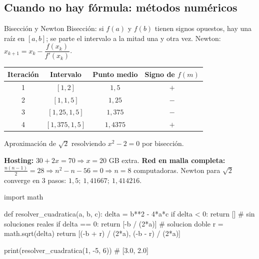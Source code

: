 \subsection{Cuando no hay f\'ormula: m\'etodos num\'ericos}
\begin{tmdef}{Bisecci\'on y Newton}
Bisecci\'on: si $f(a)$ y $f(b)$ tienen signos opuestos, hay una ra\'iz en $[a,b]$; se parte el intervalo a la mitad una y otra vez. Newton: $x_{k+1}=x_k-\dfrac{f(x_k)}{f'(x_k)}$.
\end{tmdef}

\begin{center}
\begin{tabular}{|c|c|c|c|}
\hline
\rowcolor{tmAzulClaro}\textbf{Iteraci\'on} & \textbf{Intervalo} & \textbf{Punto medio} & \textbf{Signo de $f(m)$}\\ \hline
1 & $[1, 2]$ & $1{,}5$ & $+$\\ \hline
2 & $[1, 1{,}5]$ & $1{,}25$ & $-$\\ \hline
3 & $[1{,}25, 1{,}5]$ & $1{,}375$ & $-$\\ \hline
4 & $[1{,}375, 1{,}5]$ & $1{,}4375$ & $+$\\ \hline
\end{tabular}

{\small Aproximaci\'on de $\sqrt2$ resolviendo $x^2-2=0$ por bisecci\'on.}
\end{center}

\begin{tmsistemas}
\textbf{Hosting:} $30+2x=70\Rightarrow x=20$ GB extra. \textbf{Red en malla completa:} $\frac{n(n-1)}{2}=28\Rightarrow n^2-n-56=0\Rightarrow n=8$ computadoras. Newton para $\sqrt2$ converge en 3 pasos: $1{,}5;\ 1{,}41667;\ 1{,}414216$.
\end{tmsistemas}

\begin{tmcodigo}
import math

def resolver_cuadratica(a, b, c):
    delta = b**2 - 4*a*c
    if delta < 0:
        return []                 # sin soluciones reales
    if delta == 0:
        return [-b / (2*a)]       # solucion doble
    r = math.sqrt(delta)
    return [(-b + r) / (2*a), (-b - r) / (2*a)]

print(resolver_cuadratica(1, -5, 6))   # [3.0, 2.0]
\end{tmcodigo}

